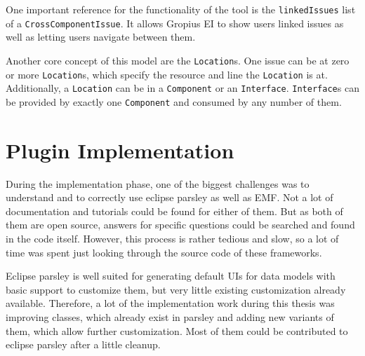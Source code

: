 One important reference for the functionality of the tool is the \lstinline|linkedIssues| list of a \lstinline|CrossComponentIssue|.
It allows Gropius EI to show users linked issues as well as letting users navigate between them.

Another core concept of this model are the \lstinline|Location|s.
One issue can be at zero or more \lstinline|Location|s, which specify the resource and line the \lstinline|Location| is at.
Additionally, a \lstinline|Location| can be in a \lstinline|Component| or an \lstinline|Interface|.
\lstinline|Interface|s can be provided by exactly one \lstinline|Component| and consumed by any number of them.

\section{Plugin Implementation}
\label{sec:ch4:s4}
During the implementation phase, one of the biggest challenges was to understand and to correctly use eclipse parsley as well as \gls{EMF}.
Not a lot of documentation and tutorials could be found for either of them.
But as both of them are open source, answers for specific questions could be searched and found in the code itself.
However, this process is rather tedious and slow, so a lot of time was spent just looking through the source code of these frameworks.

Eclipse parsley is well suited for generating default \glspl{UI} for data models with basic support to customize them, 
but very little existing customization already available.
Therefore, a lot of the implementation work during this thesis was improving classes, which already exist in parsley 
and adding new variants of them, which allow further customization.
Most of them could be contributed to eclipse parsley after a little cleanup.

